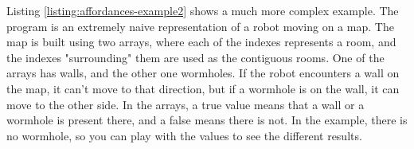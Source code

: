\documentclass[11pt,fleqn,openany]{book} %
\begin{document}
Listing \ref{listing:affordances-example2} shows a much more complex example. The program is an extremely naive representation of a robot moving on a map. The map is built using two arrays, where each of the indexes represents a room, and the indexes "surrounding" them are used as the contiguous rooms. One of the arrays has walls, and the other one wormholes. If the robot encounters a wall on the map, it can't move to that direction, but if a wormhole is on the wall, it can move to the other side. In the arrays, a true value means that a wall or a wormhole is present there, and a false means there is not. In the example, there is no wormhole, so you can play with the values to see the different results.



\end{document}
